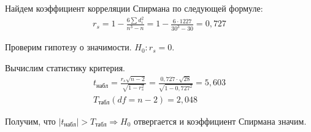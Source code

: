 \documentclass[utf8, a4paper, 14pt, russian, oneside]{book}
\begin{document}
Найдем коэффициент корреляции Спирмана по следующей формуле:
\begin{align*}
    r_s = 1 - \frac{6\sum d_i^2}{n^3 - n} = 1 - \frac{6 \cdot 1227}{30^3 - 30} = 0,727
\end{align*}

Проверим гипотезу о значимости. $H_0 :r_s = 0$.

Вычислим статистику критерия.
\begin{gather*}
    t_{\text{набл}} = \frac{r_s \sqrt{n-2}}{\sqrt{1 - r_s^2}} = \frac{0,727 \cdot \sqrt{28}}{\sqrt{1 - 0,727^2}} = 5,603 \\ 
    T_{\text{табл}}(df = n - 2)=2,048
\end{gather*}

Получим, что $|t_{\text{набл}}| > T_{\text{табл}} \Rightarrow H_0$ отвергается и коэффициент Спирмана значим.
\end{document}
